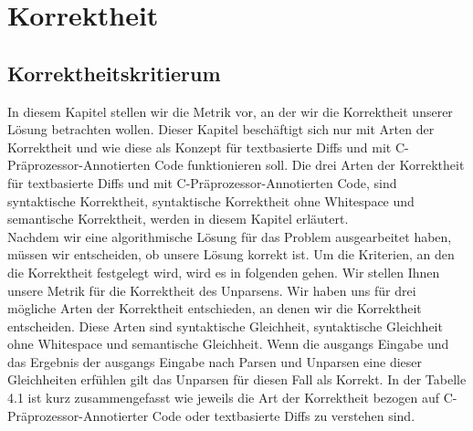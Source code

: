 \chapter{Korrektheit}


\section{Korrektheitskritierum}

In diesem Kapitel stellen wir die Metrik vor, an der wir die Korrektheit unserer Lösung betrachten wollen. Dieser Kapitel beschäftigt sich nur mit Arten der Korrektheit und wie diese als Konzept für textbasierte Diffs und mit C-Präprozessor-Annotierten Code funktionieren soll. Die drei Arten der Korrektheit für textbasierte Diffs und mit C-Präprozessor-Annotierten Code, sind syntaktische Korrektheit, syntaktische Korrektheit ohne Whitespace und semantische Korrektheit, werden in diesem Kapitel erläutert.\\


Nachdem wir eine algorithmische Lösung für das Problem ausgearbeitet haben, müssen wir entscheiden, ob unsere Lösung korrekt ist. Um die Kriterien, an den die Korrektheit festgelegt wird, wird es in folgenden gehen. Wir stellen Ihnen unsere Metrik für die Korrektheit des Unparsens. Wir haben uns für drei mögliche Arten der Korrektheit entschieden, an denen wir die Korrektheit entscheiden. Diese Arten sind syntaktische Gleichheit, syntaktische Gleichheit ohne Whitespace und semantische Gleichheit. Wenn die ausgangs Eingabe und das Ergebnis der ausgangs Eingabe nach Parsen und Unparsen eine dieser Gleichheiten erfühlen gilt das Unparsen für diesen Fall als Korrekt. In der Tabelle 4.1 ist kurz zusammengefasst wie jeweils die Art der Korrektheit bezogen auf C-Präprozessor-Annotierter Code oder textbasierte Diffs zu verstehen sind.

